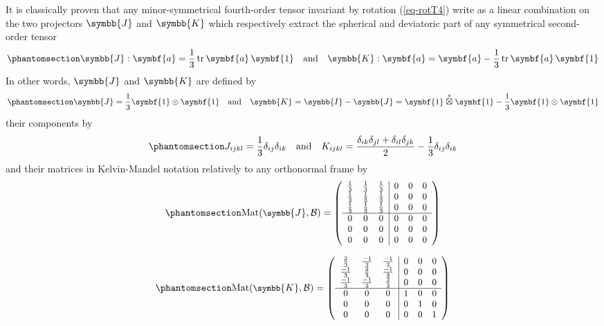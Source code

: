 \documentclass[
  a4paper,
  numbers=noendperiod,
  DIV=12]{scrreprt}
\newcommand{\uu}[1]{{\symbf{{#1}}}}
\newcommand{\uuuu}[1]{{\symbb{{#1}}}}
\newcommand{\sboxtimes}{\stackrel{s}{\boxtimes}}
\DeclareMathOperator{\Mat}{Mat}
\DeclareMathOperator{\tr}{tr}
\begin{document}
It is classically proven that any minor-symmetrical fourth-order tensor
invariant by rotation (\ref{eq-rotT4}) write as a linear combination on
the two projectors \(\uuuu{J}\) and \(\uuuu{K}\) which respectively
extract the spherical and deviatoric part of any symmetrical
second-order tensor \begin{equation}\phantomsection\label{eq-JKext}{
\uuuu{J}:\uu{a}=\frac{1}{3}\tr{\uu{a}}\,\uu{1}
\quad \textrm{and} \quad
\uuuu{K}:\uu{a}=\uu{a}-\frac{1}{3}\tr{\uu{a}}\,\uu{1}
}\end{equation} In other words, \(\uuuu{J}\) and \(\uuuu{K}\) are
defined by \begin{equation}\phantomsection\label{eq-JK}{
\uuuu{J}=\frac{1}{3}\uu{1}\otimes\uu{1}
\quad \textrm{and} \quad
\uuuu{K}=\uuuu{I}-\uuuu{J}=\uu{1}\sboxtimes\uu{1}-\frac{1}{3}\uu{1}\otimes\uu{1}
}\end{equation} their components by
\begin{equation}\phantomsection\label{eq-JKijkl}{
J_{ijkl}=\frac{1}{3}\delta_{ij}\delta_{ik}
\quad \textrm{and} \quad
K_{ijkl}=\frac{\delta_{ik}\delta_{jl}+\delta_{il}\delta_{jk}}{2}-\frac{1}{3}\delta_{ij}\delta_{ik}
}\end{equation} and their matrices in Kelvin-Mandel notation relatively
to any orthonormal frame by
\begin{equation}\phantomsection\label{eq-matJ}{
\small
\Mat(\uuuu{J},\mathcal{B})=
   \left(
   \begin{array}{ccc|ccc}
   \frac{1}{3} & \frac{1}{3} & \frac{1}{3} & 0 & 0 & 0 \\
   \frac{1}{3} & \frac{1}{3} & \frac{1}{3} & 0 & 0 & 0 \\
   \frac{1}{3} & \frac{1}{3} & \frac{1}{3} & 0 & 0 & 0 \\
   \hline
   0 & 0 & 0 & 0 & 0 & 0 \\
   0 & 0 & 0 & 0 & 0 & 0 \\
   0 & 0 & 0 & 0 & 0 & 0 \\
   \end{array}
   \right)
}\end{equation}

\begin{equation}\phantomsection\label{eq-matK}{
\small
\Mat(\uuuu{K},\mathcal{B})=
   \left(
   \begin{array}{ccc|ccc}
   \frac{2}{3} & \frac{-1}{3} & \frac{-1}{3} & 0 & 0 & 0 \\
   \frac{-1}{3} & \frac{2}{3} & \frac{-1}{3} & 0 & 0 & 0 \\
   \frac{-1}{3} & \frac{-1}{3} & \frac{2}{3} & 0 & 0 & 0 \\
   \hline
   0 & 0 & 0 & 1 & 0 & 0 \\
   0 & 0 & 0 & 0 & 1 & 0 \\
   0 & 0 & 0 & 0 & 0 & 1 \\
   \end{array}
   \right)
}\end{equation}
\end{document}
